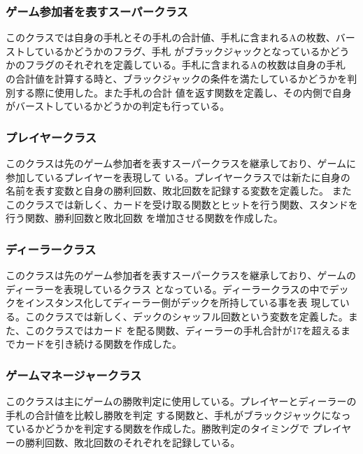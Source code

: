 \subsubsection{ゲーム参加者を表すスーパークラス}
このクラスでは自身の手札とその手札の合計値、手札に含まれるAの枚数、バーストしているかどうかのフラグ、手札
がブラックジャックとなっているかどうかのフラグのそれぞれを定義している。手札に含まれるAの枚数は自身の手札
の合計値を計算する時と、ブラックジャックの条件を満たしているかどうかを判別する際に使用した。また手札の合計
値を返す関数を定義し、その内側で自身がバーストしているかどうかの判定も行っている。

\subsubsection{プレイヤークラス}
このクラスは先のゲーム参加者を表すスーパークラスを継承しており、ゲームに参加しているプレイヤーを表現して
いる。プレイヤークラスでは新たに自身の名前を表す変数と自身の勝利回数、敗北回数を記録する変数を定義した。
またこのクラスでは新しく、カードを受け取る関数とヒットを行う関数、スタンドを行う関数、勝利回数と敗北回数
を増加させる関数を作成した。

\subsubsection{ディーラークラス}
このクラスは先のゲーム参加者を表すスーパークラスを継承しており、ゲームのディーラーを表現しているクラス
となっている。ディーラークラスの中でデックをインスタンス化してディーラー側がデックを所持している事を表
現している。このクラスでは新しく、デックのシャッフル回数という変数を定義した。また、このクラスではカード
を配る関数、ディーラーの手札合計が17を超えるまでカードを引き続ける関数を作成した。

\subsubsection{ゲームマネージャークラス}
このクラスは主にゲームの勝敗判定に使用している。プレイヤーとディーラーの手札の合計値を比較し勝敗を判定
する関数と、手札がブラックジャックになっているかどうかを判定する関数を作成した。勝敗判定のタイミングで
プレイヤーの勝利回数、敗北回数のそれぞれを記録している。

